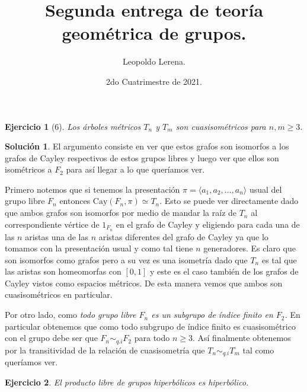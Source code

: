 \documentclass[12pt]{article}
\title{\color{red!55!black} Segunda entrega de teoría geométrica de grupos.}
\author{Leopoldo Lerena.}
\date{2do Cuatrimestre de 2021.}
\theoremstyle{plain}
\newtheorem*{ej}{Ejercicio}
\theoremstyle{definition}
\newtheorem*{sol}{Solución}
\theoremstyle{remark}
\newcommand{\Cay}{\text{{Cay}}}
\begin{document}
	\maketitle
	
\begin{tcolorbox}[colback=teal!25!white,colframe=teal!75!black]
	\begin{ej}[6]
	Los árboles métricos $T_n$ y $T_m$ son cuasisométricos para $n,m \ge 3$.
	\end{ej}
\end{tcolorbox}	

\begin{sol}
	El argumento consiste en ver que estos grafos son isomorfos a los grafos de Cayley respectivos de estos grupos libres y luego ver que ellos son isométricos a $F_2$ para así llegar a lo que queríamos ver.
	
	Primero notemos que si tenemos la presentación $\pi=\langle a_1,a_2, \dots, a_n \rangle$ usual del grupo libre $F_n$ entonces $\Cay(F_n, \pi) \simeq T_n$. Esto se puede ver directamente dado que ambos grafos son isomorfos por medio de mandar la raíz de $T_n$ al correspondiente vértice de $1_{F_n}$ en el grafo de Cayley y eligiendo para cada una de las $n$ aristas una de las $n$ aristas diferentes del grafo de Cayley ya que lo tomamos con la presentación usual y como tal tiene $n$ generadores. Es claro que son isomorfos como grafos pero a su vez es una isometría dado que $T_n$ es tal que las aristas son homeomorfas con $[0,1]$ y este es el caso también de los grafos de Cayley vistos como espacios métricos. De esta manera vemos que ambos son cuasisométricos en particular.
	
	
	Por otro lado, como \emph{todo grupo libre $F_n$ es un subgrupo de índice finito en $F_2$.} En particular obtenemos que como todo subgrupo de índice finito es cuasisométrico con el grupo debe ser que $F_n \sim_{q.i} F_2$ para todo $n \ge 3$. Así finalmente obtenemos por la transitividad de la relación de cuasisometría que $T_n \sim_{q.i} T_m$ tal como queríamos ver.
\end{sol}
	

\newpage
	
	
	
\bigskip
\begin{tcolorbox}[colback=teal!25!white,colframe=teal!75!black]
	\begin{ej}
		El producto libre de grupos hiperbólicos es hiperbólico.
	\end{ej}	
\end{tcolorbox}
\medskip	
	
\end{document}
